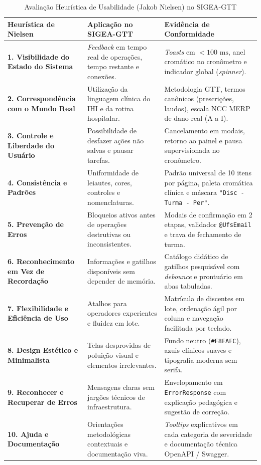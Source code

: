 \begin{table}[!ht]
\centering
\caption{Avaliação Heurística de Usabilidade (Jakob Nielsen) no SIGEA-GTT}
\label{tab_avaliacao_heuristicas_nielsen}
\footnotesize
\begin{tabularx}{\textwidth}{p{4.2cm} p{4.6cm} X}
\toprule
\textbf{Heurística de Nielsen} & \textbf{Aplicação no SIGEA-GTT} & \textbf{Evidência de Conformidade} \\
\midrule
\textbf{1. Visibilidade do Estado do Sistema} & \textit{Feedback} em tempo real de operações, tempo restante e conexões. & \textit{Toasts} em $<100\text{ ms}$, anel cromático no cronômetro e indicador global (\textit{spinner}). \\
\addlinespace
\textbf{2. Correspondência com o Mundo Real} & Utilização da linguagem clínica do IHI e da rotina hospitalar. & Metodologia GTT, termos canônicos (prescrições, laudos), escala NCC MERP de dano real (A a I). \\
\addlinespace
\textbf{3. Controle e Liberdade do Usuário} & Possibilidade de desfazer ações não salvas e pausar tarefas. & Cancelamento em modais, retorno ao painel e pausa supervisionada no cronômetro. \\
\addlinespace
\textbf{4. Consistência e Padrões} & Uniformidade de leiautes, cores, controles e nomenclaturas. & Padrão universal de 10 itens por página, paleta cromática clínica e máscara \texttt{"Disc - Turma - Per"}. \\
\addlinespace
\textbf{5. Prevenção de Erros} & Bloqueios ativos antes de operações destrutivas ou inconsistentes. & Modais de confirmação em 2 etapas, validador \texttt{@UfsEmail} e trava de fechamento de turma. \\
\addlinespace
\textbf{6. Reconhecimento em Vez de Recordação} & Informações e gatilhos disponíveis sem depender de memória. & Catálogo didático de gatilhos pesquisável com \textit{debounce} e prontuário em abas tabuladas. \\
\addlinespace
\textbf{7. Flexibilidade e Eficiência de Uso} & Atalhos para operadores experientes e fluidez em lote. & Matrícula de discentes em lote, ordenação ágil por coluna e navegação facilitada por teclado. \\
\addlinespace
\textbf{8. Design Estético e Minimalista} & Telas desprovidas de poluição visual e elementos irrelevantes. & Fundo neutro (\texttt{\#F8FAFC}), azuis clínicos suaves e tipografia moderna sem serifa. \\
\addlinespace
\textbf{9. Reconhecer e Recuperar de Erros} & Mensagens claras sem jargões técnicos de infraestrutura. & Envelopamento em \texttt{ErrorResponse} com explicação pedagógica e sugestão de correção. \\
\addlinespace
\textbf{10. Ajuda e Documentação} & Orientações metodológicas contextuais e documentação viva. & \textit{Tooltips} explicativos em cada categoria de severidade e documentação técnica OpenAPI / Swagger. \\
\bottomrule
\end{tabularx}
\end{table}

